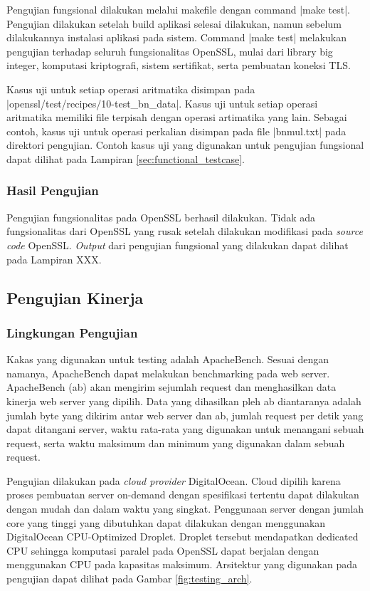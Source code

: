       Pengujian fungsional dilakukan melalui makefile dengan command |make test|. Pengujian dilakukan setelah build aplikasi selesai dilakukan, namun sebelum dilakukannya instalasi aplikasi pada sistem. Command |make test| melakukan pengujian terhadap seluruh fungsionalitas OpenSSL, mulai dari library big integer, komputasi kriptografi, sistem sertifikat, serta pembuatan koneksi TLS.

      Kasus uji untuk setiap operasi aritmatika disimpan pada |openssl/test/recipes/10-test_bn_data|. Kasus uji untuk setiap operasi aritmatika memiliki file terpisah dengan operasi artimatika yang lain. Sebagai contoh, kasus uji untuk operasi perkalian disimpan pada file |bnmul.txt| pada direktori pengujian. Contoh kasus uji yang digunakan untuk pengujian fungsional dapat dilihat pada Lampiran \ref{sec:functional_testcase}.

    \subsubsection{Hasil Pengujian}
      Pengujian fungsionalitas pada OpenSSL berhasil dilakukan. Tidak ada fungsionalitas dari OpenSSL yang rusak setelah dilakukan modifikasi pada \textit{source code} OpenSSL. \textit{Output} dari pengujian fungsional yang dilakukan dapat dilihat pada Lampiran XXX. 

  \subsection{Pengujian Kinerja}

    \subsubsection{Lingkungan Pengujian}

      Kakas yang digunakan untuk testing adalah ApacheBench. Sesuai dengan namanya, ApacheBench dapat melakukan benchmarking pada web server. ApacheBench (ab) akan mengirim sejumlah request dan menghasilkan data kinerja web server yang dipilih. Data yang dihasilkan pleh ab diantaranya adalah jumlah byte yang dikirim antar web server dan ab, jumlah request per detik yang dapat ditangani server, waktu rata-rata yang digunakan untuk menangani sebuah request, serta waktu maksimum dan minimum yang digunakan dalam sebuah request.

      Pengujian dilakukan pada \textit{cloud provider} DigitalOcean. Cloud dipilih karena proses pembuatan server on-demand dengan spesifikasi tertentu dapat dilakukan dengan mudah dan dalam waktu yang singkat. Penggunaan server dengan jumlah core yang tinggi yang dibutuhkan dapat dilakukan dengan menggunakan DigitalOcean CPU-Optimized Droplet. Droplet tersebut mendapatkan dedicated CPU sehingga komputasi paralel pada OpenSSL dapat berjalan dengan menggunakan CPU pada kapasitas maksimum. Arsitektur yang digunakan pada pengujian dapat dilihat pada Gambar \ref{fig:testing_arch}.

